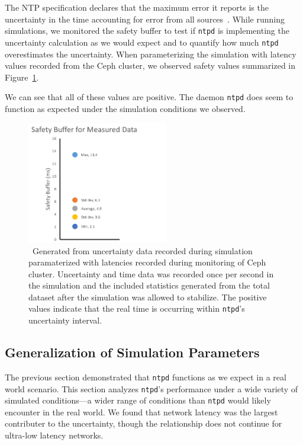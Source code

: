 The NTP specification declares that the maximum error it reports is
the uncertainty in the time accounting for error from all
sources~\citep{Burbank2010}.  While running simulations, we monitored
the safety buffer to test if \texttt{ntpd} is implementing the
uncertainty calculation as we would expect and to quantify how much
\texttt{ntpd} overestimates the uncertainty.  When parameterizing the
simulation with latency values recorded from the Ceph cluster, we
observed safety values summarized in Figure~\ref{fig:safety-data}.

We can see that all of these values are positive. The daemon
\texttt{ntpd} does seem to function as expected under the simulation
conditions we observed.

\begin{figure}[!htbp]
  \caption{~Generated from uncertainty data recorded during simulation paramaterized
  with latencies recorded during monitoring of Ceph cluster. Uncertainty and time
  data was recorded once per second in the simulation and the included statistics 
  generated from the total dataset after the simulation was allowed to stabilize. 
  The positive values indicate that the real time is occurring within \texttt{ntpd}'s 
  uncertainty interval.}
  \label{fig:safety-data}
  \centering
  \includegraphics[width=0.55\textwidth]{5pointsSafety.png}
\end{figure}

\subsection{Generalization of Simulation Parameters}

The previous section demonstrated that \texttt{ntpd} functions as we expect in 
a real world scenario.  This section
analyzes \texttt{ntpd}'s performance under a wide variety of simulated
conditions---a wider range of conditions than \texttt{ntpd} would
likely encounter in the real world.  We found that network latency was the 
largest contributer to the uncertainty, though the relationship does not 
continue for ultra-low latency networks.

